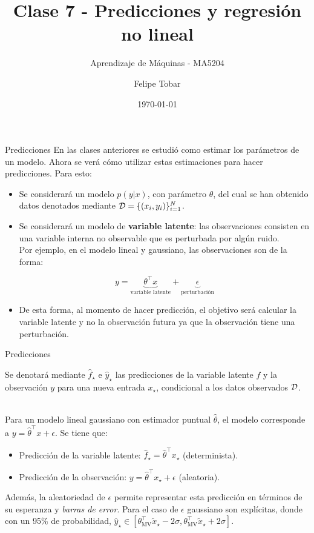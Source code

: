 \documentclass[9pt]{beamer}
\title{Clase 7 - Predicciones y regresión no lineal}
\subtitle{Aprendizaje de Máquinas - MA5204}
\date{\today}
\author{Felipe Tobar}
\institute{Department of Mathematical Engineering \&\\ Center for Mathematical Modelling\\Universidad de Chile}
\begin{document}
\begin{frame}
  \titlepage
\end{frame}

\begin{frame}{Predicciones}
	En las clases anteriores se estudió como estimar los parámetros de un modelo. Ahora se verá cómo utilizar estas estimaciones para hacer predicciones. Para esto:
	
	\begin{itemize}
		\item Se considerará un modelo $p(y|x)$, con parámetro $\theta$, del cual se han obtenido datos denotados mediante ${\mathcal D} = \{(x_i,y_i)\}_{i=1}^N$.\pause
		\item Se considerará un modelo de \textbf{variable latente}: las observaciones consisten en una variable interna no observable que es perturbada por algún ruido. \\
		Por ejemplo, en el modelo lineal y gaussiano, las observaciones son de la forma:

			\begin{equation*}
				y= \underbrace{\theta^\top x}_{\text{variable latente}} + \underbrace{\epsilon}_{\text{perturbación}}
			\end{equation*}\pause
		\item De esta forma, al momento de hacer predicción, el objetivo será calcular la variable latente y no la observación futura ya que la observación tiene una perturbación.
	\end{itemize}
	
\end{frame}

\begin{frame}{Predicciones}

Se denotará mediante $\hat f_\star$ e $\hat y_\star$ las predicciones de la variable latente $f$ y la observación $y$ para una nueva entrada $x_\star$, condicional a los datos observados ${\mathcal D}$.\\~\ \pause

Para un modelo lineal gaussiano con estimador puntual $\hat{\theta}$, el modelo corresponde a $y=\hat{\theta}^\top x + \epsilon$. \pause Se tiene que:

\begin{itemize}
	\item Predicción de la variable latente: $\hat f_\star=\hat{\theta}^\top x_\star$ (determinista).\pause
	\item Predicción de la observación: $y=\hat{\theta}^\top x_\star + \epsilon$ (aleatoria).\pause
\end{itemize}

Además, la aleatoriedad de $\epsilon$ permite representar esta predicción en términos de su esperanza y \emph{barras de error}. Para el caso de $\epsilon$ gaussiano son explícitas, donde con un 95\% de probabilidad, $\hat y_\star\in[\theta_{\text{MV}}^\top \tilde{x}_\star - 2\sigma,\theta_{\text{MV}}^\top \tilde{x}_\star + 2\sigma]$.
	
\end{frame}
\end{document}
